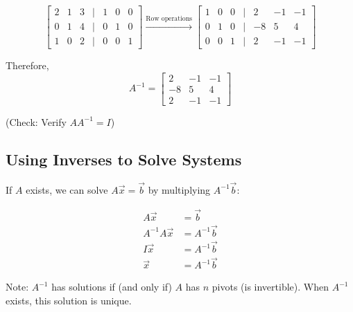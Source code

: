 \documentclass[12pt,a4paper]{article}
\begin{document}
\[
\begin{bmatrix}
2 & 1 & 3 & | & 1 & 0 & 0 \\
0 & 1 & 4 & | & 0 & 1 & 0 \\
1 & 0 & 2 & | & 0 & 0 & 1
\end{bmatrix}
\xrightarrow{\text{Row operations}}
\begin{bmatrix}
1 & 0 & 0 & | & 2 & -1 & -1 \\
0 & 1 & 0 & | & -8 & 5 & 4 \\
0 & 0 & 1 & | & 2 & -1 & -1
\end{bmatrix}
\]

Therefore, 
\[A^{-1} = \begin{bmatrix} 2 & -1 & -1 \\ -8 & 5 & 4 \\ 2 & -1 & -1 \end{bmatrix}\]

(Check: Verify $AA^{-1} = I$)

\subsection{Using Inverses to Solve Systems}

If $A$ exists, we can solve $A\vec{x} = \vec{b}$ by multiplying $A^{-1}\vec{b}$:

\begin{align*}
A\vec{x} &= \vec{b} \\
A^{-1}A\vec{x} &= A^{-1}\vec{b} \\
I\vec{x} &= A^{-1}\vec{b} \\
\vec{x} &= A^{-1}\vec{b}
\end{align*}

Note: $A^{-1}$ has solutions if (and only if) $A$ has $n$ pivots (is invertible). When $A^{-1}$ exists, this solution is unique.
\end{document}
